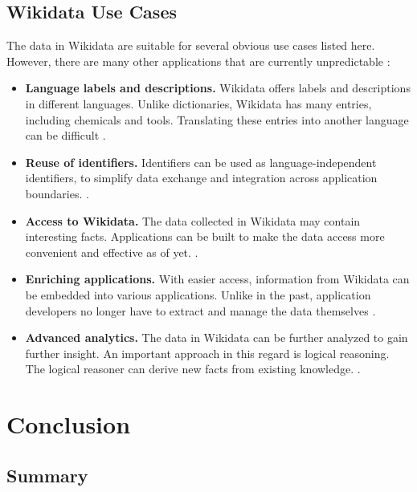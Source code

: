 ﻿\documentclass[11pt,titlepage,oneside,openany]{book}
\begin{document}
\section{Wikidata Use Cases}
The data in Wikidata are suitable for several obvious use cases listed here. However, there are many other applications that are currently unpredictable \cite{AFCK01}:
\begin{itemize}
	\item \textbf{Language labels and descriptions. } Wikidata offers labels and descriptions in different languages. Unlike dictionaries, Wikidata has many entries, including chemicals and tools. Translating these entries into another language can be difficult \cite{AFCK01}. 
	\item \textbf{Reuse of identifiers. } Identifiers can be used as language-independent identifiers, to simplify  data exchange and integration across application boundaries. \cite{AFCK01}. 
	\item \textbf{Access to Wikidata. } The data collected in Wikidata may contain interesting facts. Applications can be built to make the data access more convenient and effective as of yet. \cite{AFCK01}.
	\item \textbf{Enriching applications. } With easier access, information from Wikidata can be embedded into various applications. Unlike in the past, application developers no longer have to extract and manage the data themselves \cite{AFCK01}.
	\item \textbf{Advanced analytics. } The data in Wikidata can be further analyzed to gain further insight. An important approach in this regard is logical reasoning. The logical reasoner can derive new facts from existing knowledge. \cite{AFCK01}. 
\end{itemize}

\chapter{Conclusion}
\label{chap:prospects}

\section{Summary}
\end{document}
